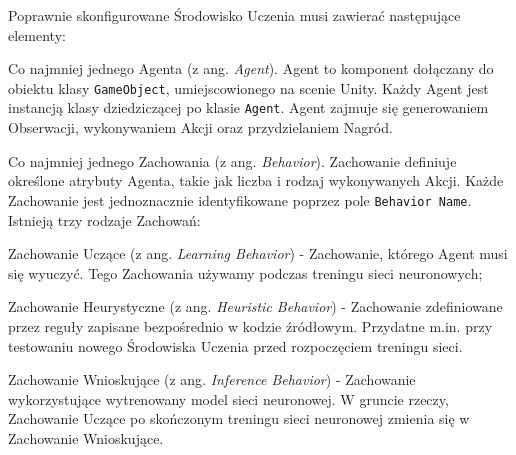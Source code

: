 Poprawnie skonfigurowane Środowisko Uczenia musi zawierać następujące elementy:
\begin{enumerate*}
\item Co najmniej jednego Agenta (z ang. \textit{Agent}). Agent to komponent dołączany do obiektu klasy \texttt{GameObject}, umiejscowionego na scenie Unity. Każdy Agent jest instancją klasy dziedziczącej po klasie \texttt{Agent}. Agent zajmuje się generowaniem Obserwacji, wykonywaniem Akcji oraz przydzielaniem Nagród.
\item Co najmniej jednego Zachowania (z ang. \textit{Behavior}). Zachowanie definiuje określone atrybuty Agenta, takie jak liczba i rodzaj wykonywanych Akcji. Każde Zachowanie jest jednoznacznie identyfikowane poprzez pole \texttt{Behavior Name}. \\
Istnieją trzy rodzaje Zachowań:
\begin{itemize*}
\item Zachowanie Uczące (z ang. \textit{Learning Behavior}) - Zachowanie, którego Agent musi się wyuczyć. Tego Zachowania używamy podczas treningu sieci neuronowych;
\item Zachowanie Heurystyczne (z ang. \textit{Heuristic Behavior}) - Zachowanie zdefiniowane przez reguły zapisane bezpośrednio w kodzie źródłowym. Przydatne m.in. przy testowaniu nowego Środowiska Uczenia przed rozpoczęciem treningu sieci.
\item Zachowanie Wnioskujące (z ang. \textit{Inference Behavior}) - Zachowanie wykorzystujące wytrenowany model sieci neuronowej. W gruncie rzeczy, Zachowanie Uczące po skończonym treningu sieci neuronowej zmienia się w Zachowanie Wnioskujące.
\end{itemize*}
\end{enumerate*}

